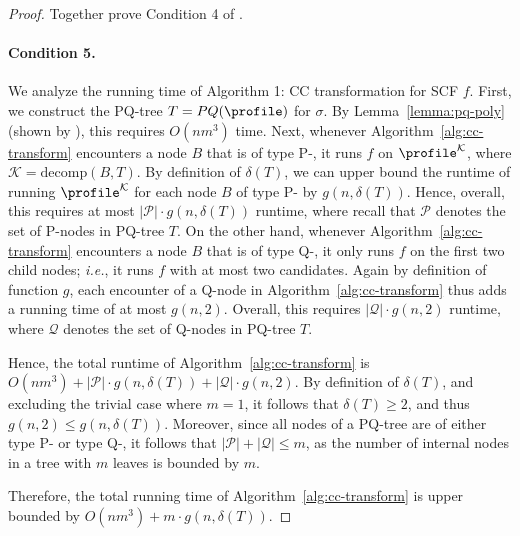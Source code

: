 \begin{proof}
Together  prove Condition 4 of .

\paragraph{Condition 5.}
We analyze the running time of Algorithm 1: CC transformation for SCF $f$.
First, we construct the PQ-tree $T = PQ(\profile)$ for $\sigma$.
By Lemma~\ref{lemma:pq-poly} (shown by \citet{Cornaz13:Kemeny}), this requires $O(nm^3)$ time.
Next, whenever Algorithm~\ref{alg:cc-transform} encounters a node $B$ that is of type P-, it runs $f$ on $\profile^\mathcal{K}$, where $\mathcal{K} = \mathrm{decomp}(B, T)$. 
By definition of $\delta(T)$, we can upper bound the runtime of running $\profile^\mathcal{K}$ for each node $B$ of type P- by $g(n, \delta(T))$.
Hence, overall, this requires at most $|\mathcal{P}| \cdot g(n, \delta(T))$ runtime, where recall that $\mathcal{P}$ denotes the set of P-nodes in PQ-tree $T$.
On the other hand, whenever Algorithm~\ref{alg:cc-transform} encounters a node $B$ that is of type Q-, it only runs $f$ on the first two child nodes; \emph{i.e.}, it runs $f$ with at most two candidates. 
Again by definition of function $g$, each encounter of a Q-node in Algorithm~\ref{alg:cc-transform} thus adds a running time of at most $g(n, 2)$. 
Overall, this requires $|\mathcal{Q}| \cdot g(n, 2)$ runtime, where $\mathcal{Q}$ denotes the set of Q-nodes in PQ-tree $T$. 

Hence, the total runtime of Algorithm~\ref{alg:cc-transform} is $O(nm^3) + |\mathcal{P}| \cdot g(n, \delta(T)) + |\mathcal{Q}| \cdot g(n, 2)$.
By definition of $\delta(T)$, and excluding the trivial case where $m=1$, it follows that $\delta(T) \geq 2$, and thus $g(n, 2) \leq g(n, \delta(T))$.
Moreover, since all nodes of a PQ-tree are of either type P- or type Q-, it follows that $|\mathcal{P}| + |\mathcal{Q}| \leq m$, as the number of internal nodes in a tree with $m$ leaves is bounded by $m$. 

Therefore, the total running time of Algorithm~\ref{alg:cc-transform} is upper bounded by $O(nm^3) + m \cdot g(n, \delta(T))$. 

\end{proof}

